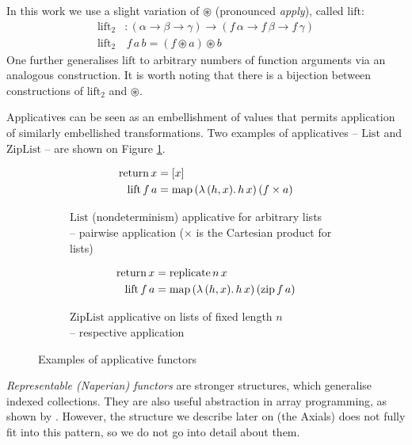 In this work we use a slight variation of $\circledast$ (pronounced \textit{apply}), called $\mathrm{lift}$:
\begin{align*}
\mathrm{lift}_2& : (\alpha \to \beta \to \gamma) \to (f\,\alpha \to f\,\beta \to f\,\gamma) \\ 
\mathrm{lift}_2&\,f\,a\,b = (f \circledast a) \circledast b
\end{align*}
One further generalises $\mathrm{lift}$ to arbitrary numbers of function arguments via an analogous construction. It is worth noting that there is a bijection between constructions of $\mathrm{lift}_2$ and $\circledast$.

Applicatives can be seen as an embellishment of values that permits application of similarly embellished transformations. Two examples of applicatives -- $\mathrm{List}$ and $\mathrm{ZipList}$ -- are shown on Figure \ref{fig:applicatives}.
%
\begin{figure}[h]
\centering
\begin{subfigure}{.5\textwidth}
  \centering
  \begin{align*}
\mathrm{return}\,x &= [x] \\
\mathrm{lift}\,f\,a &= \mathrm{map}\,(\lambda\,(h, x) \ldotp h\,x)\,(f \times a)
  \end{align*}
  \caption{$\mathrm{List}$ (nondeterminism) applicative for arbitrary lists \\ -- pairwise application ($\times$ is the Cartesian product for lists)}
\end{subfigure}%
\begin{subfigure}{.5\textwidth}
  \centering
  \begin{align*}
\mathrm{return}\,x &= \mathrm{replicate}\,n\,x \\
\mathrm{lift}\,f\,a &= \mathrm{map}\,(\lambda\,(h, x) \ldotp h\,x)\,(\mathrm{zip}\,f\,a)
  \end{align*}
  \caption{$\mathrm{ZipList}$ applicative on lists of fixed length $n$ \\ -- respective application}
\end{subfigure}
\caption{Examples of applicative functors}
\label{fig:applicatives}
\end{figure}

\textit{Representable (Naperian) functors} are stronger structures, which generalise indexed collections. They are also useful abstraction in array programming, as shown by \textcite{gibbons2016aplicative}. However, the structure we describe later on (the Axials) does not fully fit into this pattern, so we do not go into detail about them.

